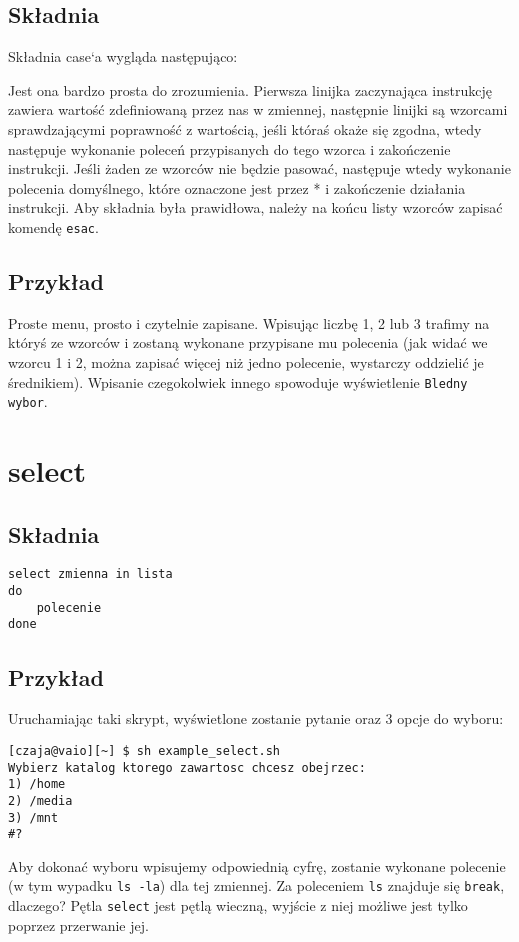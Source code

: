 \subsection{Składnia}
Składnia case`a wygląda następująco:



Jest ona bardzo prosta do zrozumienia. Pierwsza linijka zaczynająca instrukcję zawiera
wartość zdefiniowaną przez nas w zmiennej, następnie linijki są wzorcami sprawdzającymi
poprawność z wartością, jeśli któraś okaże się zgodna, wtedy następuje wykonanie poleceń
przypisanych do tego wzorca i zakończenie instrukcji. Jeśli żaden ze wzorców nie będzie
pasować, następuje wtedy wykonanie polecenia domyślnego, które oznaczone jest przez * i
zakończenie działania instrukcji. Aby składnia była prawidłowa, należy na końcu listy
wzorców zapisać komendę \texttt{esac}.

\subsection{Przykład} 



Proste menu, prosto i czytelnie zapisane. Wpisując liczbę 1, 2 lub 3 trafimy na któryś ze
wzorców i zostaną wykonane przypisane mu polecenia (jak widać we wzorcu 1 i 2, można
zapisać więcej niż jedno polecenie, wystarczy oddzielić je średnikiem). Wpisanie
czegokolwiek innego spowoduje wyświetlenie \texttt{Bledny wybor}.
\newline

\section{select}
\subsection{Składnia}

\begin{lstlisting}
select zmienna in lista
do
	polecenie
done
\end{lstlisting}

\subsection{Przykład}


Uruchamiając taki skrypt, wyświetlone zostanie pytanie oraz 3 opcje do wyboru: \newline
\begin{verbatim}
[czaja@vaio][~] $ sh example_select.sh
Wybierz katalog ktorego zawartosc chcesz obejrzec:
1) /home
2) /media
3) /mnt
#?
\end{verbatim}
Aby dokonać wyboru wpisujemy odpowiednią cyfrę, zostanie wykonane polecenie (w tym
wypadku \texttt{ls -la}) dla tej zmiennej. Za poleceniem \texttt{ls} znajduje się \texttt{break}, dlaczego? Pętla \texttt{select} jest pętlą wieczną, wyjście z niej możliwe jest tylko poprzez przerwanie jej.
 
